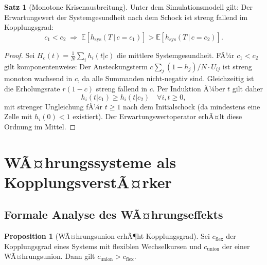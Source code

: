﻿\documentclass[a4paper,12pt]{article}
\theoremstyle{definition}
\newtheorem{satz}{Satz}
\newtheorem{proposition}{Proposition}
\begin{document}
\begin{satz}[Monotone Krisenausbreitung]
\label{satz:monoton}
    Unter dem Simulationsmodell gilt: Der Erwartungswert der Systemgesundheit nach dem
    Schock ist streng fallend im Kopplungsgrad:
    \[
        c_1 < c_2 \;\Rightarrow\; \mathbb{E}[h_{\text{sys}}(T\,|\,c=c_1)]
        > \mathbb{E}[h_{\text{sys}}(T\,|\,c=c_2)].
    \]
\end{satz}

\begin{proof}
    Sei $H_c(t) = \frac{1}{N}\sum_i h_i(t|c)$ die mittlere Systemgesundheit. FÃ¼r
    $c_1 < c_2$ gilt komponentenweise: Der Ansteckungsterm
    $c\sum_j (1-h_j)/N \cdot U_{ij}$ ist streng monoton wachsend in $c$, da alle
    Summanden nicht-negativ sind. Gleichzeitig ist die Erholungsrate $r(1-c)$ streng
    fallend in $c$. Per Induktion Ã¼ber $t$ gilt daher
    \[
        h_i(t|c_1) \geq h_i(t|c_2) \quad \forall i, t \geq 0,
    \]
    mit strenger Ungleichung fÃ¼r $t \geq 1$ nach dem Initialschock (da mindestens eine
    Zelle mit $h_i(0) < 1$ existiert). Der Erwartungswertoperator erhÃ¤lt diese Ordnung
    im Mittel.
\end{proof}

\section{WÃ¤hrungssysteme als KopplungsverstÃ¤rker}

\subsection{Formale Analyse des WÃ¤hrungseffekts}

\begin{proposition}[WÃ¤hrungsunion erhÃ¶ht Kopplungsgrad]
\label{prop:waehrung}
    Sei $c_{\text{flex}}$ der Kopplungsgrad eines Systems mit flexiblen Wechselkursen
    und $c_{\text{union}}$ der einer WÃ¤hrungsunion. Dann gilt
    $c_{\text{union}} > c_{\text{flex}}$.
\end{proposition}
\end{document}
